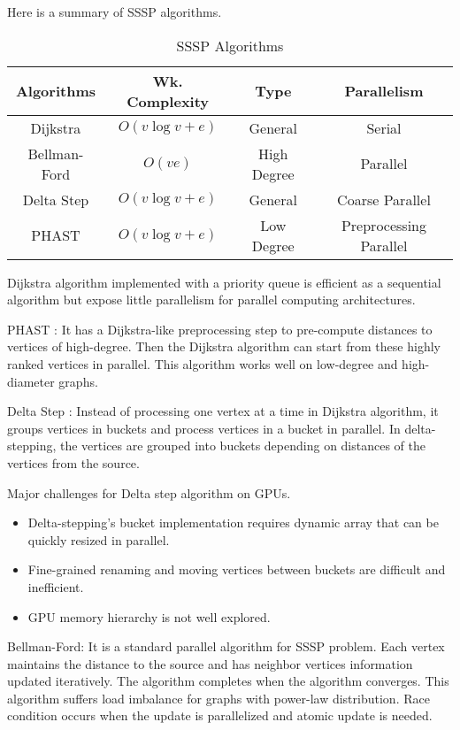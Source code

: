 Here is a summary of SSSP algorithms.
\begin{table}[!hbp]
    \begin{center}
    \begin{tabular}{cccc}
        \toprule[2pt]
         \textbf{Algorithms} & \textbf{Wk. Complexity} & \textbf{Type} &
         \textbf{Parallelism}\\
        \hline
        Dijkstra & $O(v\log{v}+e)$ & General & Serial \\
        Bellman-Ford & $O(ve)$ & High Degree & Parallel \\
        Delta Step & $O(v\log{v}+e)$ & General & Coarse Parallel \\
        PHAST & $O(v\log{v}+e)$ & Low Degree & Preprocessing Parallel \\
        \bottomrule[2pt]
    \end{tabular}
    \end{center}
    \caption{SSSP Algorithms}
\end{table} 

Dijkstra algorithm implemented with a priority queue is efficient as a
sequential algorithm but expose little parallelism for parallel computing
architectures.

PHAST \cite{delling2013phast}: It has a Dijkstra-like preprocessing step to pre-compute distances to
vertices of high-degree. Then the Dijkstra algorithm can start from these highly ranked
vertices in parallel. This algorithm works well on low-degree and high-diameter
graphs.

Delta Step \cite{meyer2003delta}: Instead of processing one vertex at a time in
Dijkstra algorithm, it groups vertices in buckets and process vertices in a
bucket in parallel. In delta-stepping, the vertices are grouped into buckets
depending on distances of the vertices from the source.

Major challenges for Delta step algorithm on GPUs.
\begin{itemize}
    \item Delta-stepping's bucket implementation requires dynamic array that can
        be quickly resized in parallel.
    \item Fine-grained renaming and moving vertices between buckets are
        difficult and inefficient.
    \item GPU memory hierarchy is not well explored.
\end{itemize}

Bellman-Ford: It is a standard parallel algorithm for SSSP problem. Each vertex
maintains the distance to the source and has neighbor vertices information
updated iteratively. The algorithm completes when the algorithm converges. 
This algorithm suffers load imbalance for graphs with power-law distribution.
Race condition occurs when the update is parallelized and atomic update is
needed.


